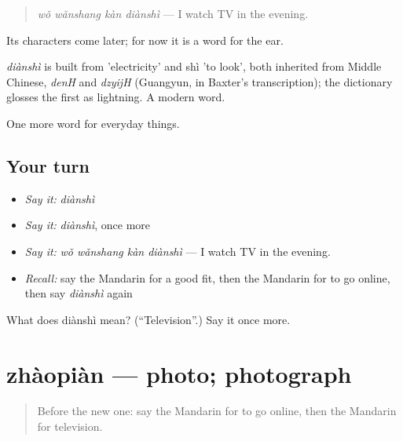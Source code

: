 \begin{quote}
\emph{wǒ wǎnshang kàn diànshì} — I watch TV in the evening.
\end{quote}

Its characters come later; for now it is a word for the ear.

\begin{cousinweb}
\emph{diànshì} is built from  'electricity' and shì 'to look', both inherited from Middle Chinese, \emph{denH} and \emph{dzyijH} (Guangyun, in Baxter's transcription); the dictionary glosses the first as lightning. A modern word.
\end{cousinweb}

\begin{grammarlens}[title={What you've built}]
One more word for everyday things.
\end{grammarlens}

\subsection*{Your turn}
\begin{itemize}
\raggedright
  \item \emph{Say it:} \emph{diànshì}
  \item \emph{Say it:} \emph{diànshì}, once more
  \item \emph{Say it:} \emph{wǒ wǎnshang kàn diànshì} — I watch TV in the evening.
  \item \emph{Recall:} say the Mandarin for a good fit, then the Mandarin for to go online, then say \emph{diànshì} again
\end{itemize}

\begin{tcolorbox}[breakable,colback=teal!4,colframe=teal!35!black,title={Before you move on}]
What does diànshì mean? (\textquotedblleft{}Television\textquotedblright{}.) Say it once more.
\end{tcolorbox}
\section[zhàopiàn]{zhàopiàn — photo; photograph}

\label{lesson:ZH-C109-zhaopian}



\begin{quote}
Before the new one: say the Mandarin for to go online, then the Mandarin for television.
\end{quote}

